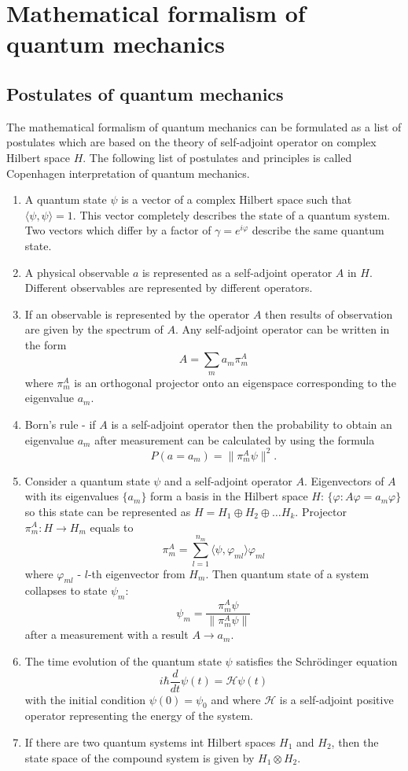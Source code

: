 \documentclass[11pt]{article}
\begin{document}
\section{Mathematical formalism of quantum mechanics}
\subsection{Postulates of quantum mechanics }
The mathematical formalism of quantum mechanics can be formulated as a list of postulates \cite{Khrennikov_information} which are based on the theory of self-adjoint operator on complex Hilbert space $H$. The following list of postulates and principles is called Copenhagen interpretation of quantum mechanics.
\begin{enumerate}[label=\bfseries Postulate \arabic*:, align=left]
  \item A quantum state $\psi$ is a vector of a complex Hilbert space such that $\langle\psi, \psi\rangle = 1$. This vector completely describes the state of a quantum system. Two vectors which differ by a factor of $\gamma = e^{i\varphi}$ describe the same quantum state.
  \item A physical observable $a$ is represented as a self-adjoint operator $A$ in $H$. Different observables are represented by different operators.
  \item If an observable is represented by the operator $A$ then results of observation are given by the spectrum of $A$. Any self-adjoint operator can be written in the form 
  \[
  A = \sum_m a_m\pi_m^A
  \]
    where $\pi_m^A$ is an orthogonal projector onto an eigenspace corresponding to the eigenvalue $a_m$.
  \item Born's rule - if $A$ is a self-adjoint operator then the probability to obtain an eigenvalue $a_m$ after measurement can be calculated by using the formula
  \[
  P(a = a_m) = \| \pi_m^A\psi\|^2.
  \]
  \item 
  Consider a quantum state $\psi$ and a self-adjoint operator $A$. Eigenvectors of $A$ with its eigenvalues $\{a_m\}$ form a basis in the Hilbert space $H$: $\{ \varphi: A\varphi = a_m\varphi\}$ so this state can be represented as $H = H_1\oplus H_2\oplus\ldots H_k$. Projector $\pi_m^A: H\to H_m$ equals to 
  \[
  \pi_m^A = \sum_{l = 1}^{n_m}\langle\psi,\varphi_{ml}\rangle\varphi_{ml}
  \]
  where $\varphi_{ml}$ - $l$-th eigenvector from $H_m$.
  Then quantum state of a system collapses to state $\psi_m$:
  \[
  \psi_m = \frac{\pi_m^A\psi}{ \| \pi_m^A\psi\|}
  \] 
  after a measurement with a result $A \to a_m$.
  \item The time evolution of the quantum state $\psi$ satisfies the Schr\"{o}dinger equation
  \[
  i\hbar \dfrac{d}{dt}\psi(t) = \mathcal{\mathcal{H}}\psi(t)
  \] 
  with the initial condition $\psi(0) = \psi_0$ and
  where $\mathcal{H}$ is a self-adjoint positive operator representing the energy of the system.
  \item If there are two quantum systems int Hilbert spaces $H_1$ and $H_2$, then the state space of the compound system is given by $H_1 \otimes H_2$.  
\end{enumerate}
\end{document}
